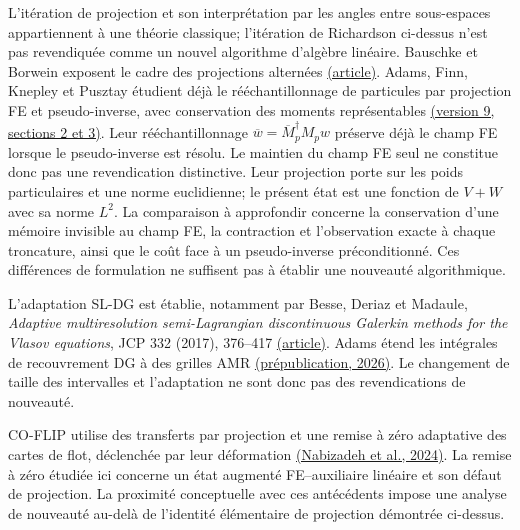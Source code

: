 \documentclass[11pt,a4paper]{article}
\begin{document}
L'itération de projection et son interprétation par les angles entre
sous-espaces appartiennent à une théorie classique; l'itération de
Richardson ci-dessus n'est pas revendiquée comme un nouvel algorithme
d'algèbre linéaire. Bauschke et Borwein exposent le cadre des projections
alternées \href{https://cmps-people.ok.ubc.ca/bauschke/Research/01.pdf}{(article)}.
Adams, Finn, Knepley et Pusztay étudient déjà le rééchantillonnage de
particules par projection FE et pseudo-inverse, avec conservation des
moments représentables
\href{https://arxiv.org/html/2501.13681v9}{(version 9, sections 2 et 3)}.
Leur rééchantillonnage $\overline w=\overline M_p^\dagger M_pw$
préserve déjà le champ FE lorsque le pseudo-inverse est résolu.
Le maintien du champ FE seul ne constitue donc pas une revendication
distinctive. Leur projection porte sur les poids particulaires et une
norme euclidienne; le présent état est une fonction de $V+W$ avec sa
norme $L^2$. La comparaison à approfondir concerne la conservation
d'une mémoire invisible au champ FE, la contraction et l'observation
exacte à chaque troncature, ainsi que le coût face à un pseudo-inverse
préconditionné. Ces différences de formulation ne suffisent pas à
établir une nouveauté algorithmique.

L'adaptation SL-DG est établie, notamment par Besse, Deriaz et Madaule,
\emph{Adaptive multiresolution semi-Lagrangian discontinuous Galerkin
methods for the Vlasov equations}, JCP 332 (2017), 376--417
\href{https://www.oca.eu/images/LAGRANGE/pages_perso/nbesse/pub/NBesse_jcp17.pdf}{(article)}.
Adams étend les intégrales de recouvrement DG à des grilles AMR
\href{https://arxiv.org/abs/2603.19959}{(prépublication, 2026)}.
Le changement de taille des intervalles et l'adaptation ne sont donc
pas des revendications de nouveauté.

CO-FLIP utilise des transferts par projection et une remise à zéro
adaptative des cartes de flot, déclenchée par leur déformation
\href{https://cseweb.ucsd.edu/~ravir/sinasiga.pdf}{(Nabizadeh et al., 2024)}.
La remise à zéro étudiée ici concerne un état augmenté FE--auxiliaire
linéaire et son défaut de projection. La proximité conceptuelle avec
ces antécédents impose une analyse de nouveauté au-delà de l'identité
élémentaire de projection démontrée ci-dessus.
\end{document}
